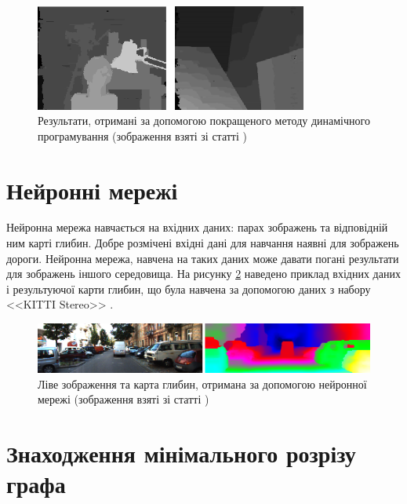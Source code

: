 \begin{figure}[h]
  \centering
  \includegraphics[width=0.8\textwidth]{images/overview_wang_dynamic}
  \caption{Результати, отримані за допомогою покращеного методу динамічного
           програмування
           (зображення взяті зі статті \cite{overview:wang:dynamic})}
  \label{fig:overview:wang:dynamic}
\end{figure}

\section{Нейронні мережі}

Нейронна мережа навчається на вхідних даних:
парах зображень та відповідній ним карті глибин.
Добре розмічені вхідні дані для навчання
наявні для зображень дороги.
Нейронна мережа, навчена на таких даних може давати погані результати для
зображень іншого середовища.
На рисунку \ref{fig:overview:luo:nn}
наведено приклад вхідних даних і результуючої карти глибин,
що була навчена за допомогою даних з набору <<KITTI Stereo>>
\cite{overview:geiger:nn}.

\begin{figure}[h]
  \centering
  \includegraphics[width=\textwidth]{images/overview_luo_nn}
  \caption{Ліве зображення та карта глибин,
           отримана за допомогою нейронної мережі
           (зображення взяті зі статті \cite{overview:luo:nn})}
  \label{fig:overview:luo:nn}
\end{figure}

\section{Знаходження мінімального розрізу графа}

